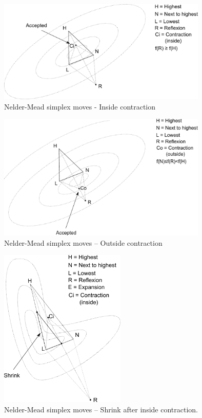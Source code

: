 \begin{figure}
\begin{center}
\includegraphics[width=10cm]{nelder-mead-contract-inside.pdf}
\end{center}
\caption{Nelder-Mead simplex moves - Inside contraction}
\label{fig-nm-moves-insidecontraction}
\end{figure}

\begin{figure}
\begin{center}
\includegraphics[width=10cm]{nelder-mead-contract-outside.pdf}
\end{center}
\caption{Nelder-Mead simplex moves -- Outside contraction}
\label{fig-nm-moves-outsidecontraction}
\end{figure}

\begin{figure}
\begin{center}
\includegraphics[width=6cm]{nelder-mead-shrink-afterci.pdf}
\end{center}
\caption{Nelder-Mead simplex moves -- Shrink after inside contraction.}
\label{fig-nm-moves-shrinkafterci}
\end{figure}

